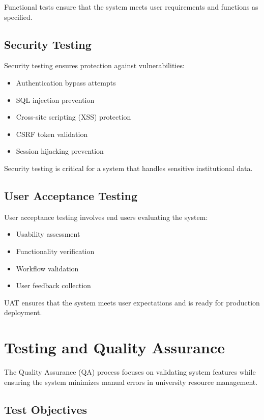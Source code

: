Functional tests ensure that the system meets user requirements and functions as specified.

\subsection{Security Testing}

Security testing ensures protection against vulnerabilities:

\begin{itemize}
    \item Authentication bypass attempts
    \item SQL injection prevention
    \item Cross-site scripting (XSS) protection
    \item CSRF token validation
    \item Session hijacking prevention
\end{itemize}

Security testing is critical for a system that handles sensitive institutional data.

\subsection{User Acceptance Testing}

User acceptance testing involves end users evaluating the system:

\begin{itemize}
    \item Usability assessment
    \item Functionality verification
    \item Workflow validation
    \item User feedback collection
\end{itemize}

UAT ensures that the system meets user expectations and is ready for production deployment.

\section{Testing and Quality Assurance}

The Quality Assurance (QA) process focuses on validating system features while ensuring the system minimizes manual errors in university resource management.

\subsection{Test Objectives}

